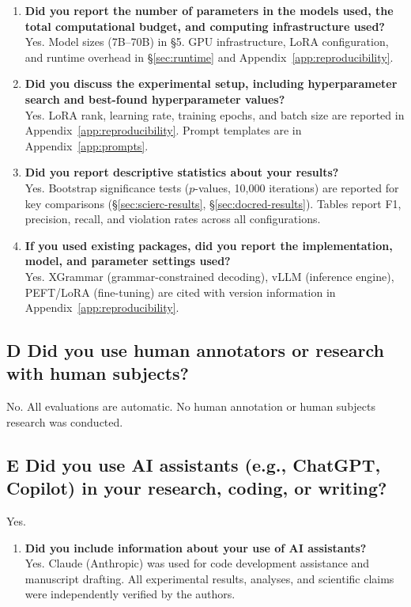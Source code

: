 \begin{enumerate}[label=\textbf{C\arabic*.},leftmargin=2.5em]
\item \textbf{Did you report the number of parameters in the models used, the total computational budget, and computing infrastructure used?}
\\ Yes. Model sizes (7B--70B) in \S5. GPU infrastructure, LoRA configuration, and runtime overhead in \S\ref{sec:runtime} and Appendix~\ref{app:reproducibility}.

\item \textbf{Did you discuss the experimental setup, including hyperparameter search and best-found hyperparameter values?}
\\ Yes. LoRA rank, learning rate, training epochs, and batch size are reported in Appendix~\ref{app:reproducibility}. Prompt templates are in Appendix~\ref{app:prompts}.

\item \textbf{Did you report descriptive statistics about your results?}
\\ Yes. Bootstrap significance tests ($p$-values, 10{,}000 iterations) are reported for key comparisons (\S\ref{sec:scierc-results}, \S\ref{sec:docred-results}). Tables report F1, precision, recall, and violation rates across all configurations.

\item \textbf{If you used existing packages, did you report the implementation, model, and parameter settings used?}
\\ Yes. XGrammar (grammar-constrained decoding), vLLM (inference engine), PEFT/LoRA (fine-tuning) are cited with version information in Appendix~\ref{app:reproducibility}.
\end{enumerate}

\subsection*{D \hspace{0.5em} Did you use human annotators or research with human subjects?}
No. All evaluations are automatic. No human annotation or human subjects research was conducted.

\subsection*{E \hspace{0.5em} Did you use AI assistants (e.g., ChatGPT, Copilot) in your research, coding, or writing?}
Yes.

\begin{enumerate}[label=\textbf{E\arabic*.},leftmargin=2.5em]
\item \textbf{Did you include information about your use of AI assistants?}
\\ Yes. Claude (Anthropic) was used for code development assistance and manuscript drafting. All experimental results, analyses, and scientific claims were independently verified by the authors.
\end{enumerate}
